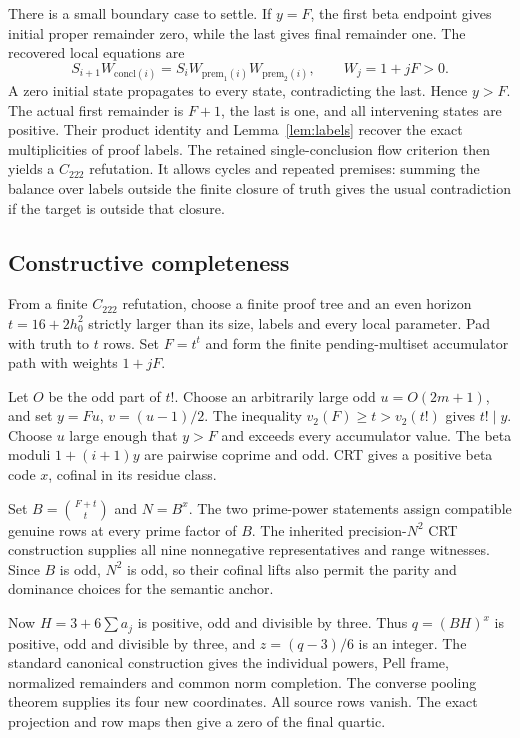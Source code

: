 \documentclass[11pt]{article}
\theoremstyle{remark}\newtheorem{remark}[theorem]{Remark}
\begin{document}
There is a small boundary case to settle. If $y=F$, the first beta
endpoint gives initial proper remainder zero, while the last gives
final remainder one. The recovered local equations are
\[
 S_{i+1}W_{\mathrm{concl}(i)}
  =S_iW_{\mathrm{prem}_1(i)}W_{\mathrm{prem}_2(i)},
 \qquad W_j=1+jF>0.
\]
A zero initial state propagates to every state, contradicting the last.
Hence $y>F$. The actual first remainder is $F+1$, the last is one,
and all intervening states are positive. Their product identity and
Lemma~\ref{lem:labels} recover the exact multiplicities of proof labels.
The retained single-conclusion flow criterion then yields a $C_{222}$
refutation. It allows cycles and repeated premises: summing the balance
over labels outside the finite closure of truth gives the usual
contradiction if the target is outside that closure.

\subsection{Constructive completeness}

From a finite $C_{222}$ refutation, choose a finite proof tree and an
even horizon $t=16+2h_0^2$ strictly larger than its size, labels and
every local parameter. Pad with truth to $t$ rows. Set $F=t^t$ and
form the finite pending-multiset accumulator path with weights $1+jF$.

Let $O$ be the odd part of $t!$. Choose an arbitrarily large odd
$u=O(2m+1)$, and set $y=Fu$, $v=(u-1)/2$. The inequality
$v_2(F)\ge t>v_2(t!)$ gives $t!\mid y$. Choose $u$ large enough
that $y>F$ and exceeds every accumulator value. The beta moduli
$1+(i+1)y$ are pairwise coprime and odd. CRT gives a positive beta
code $x$, cofinal in its residue class.

Set $B=\binom{F+t}{t}$ and $N=B^x$. The two prime-power statements
assign compatible genuine rows at every prime factor of $B$.
The inherited precision-$N^2$ CRT construction supplies all nine
nonnegative representatives and range witnesses. Since $B$ is odd,
$N^2$ is odd, so their cofinal lifts also permit the parity and
dominance choices for the semantic anchor.

Now $H=3+6\sum a_j$ is positive, odd and divisible by three.
Thus $q=(BH)^x$ is positive, odd and divisible by three, and
$z=(q-3)/6$ is an integer. The standard canonical construction gives
the individual powers, Pell frame, normalized remainders and common
norm completion. The converse pooling theorem supplies its four new
coordinates. All source rows vanish. The exact projection and row
maps then give a zero of the final quartic.
\end{document}
